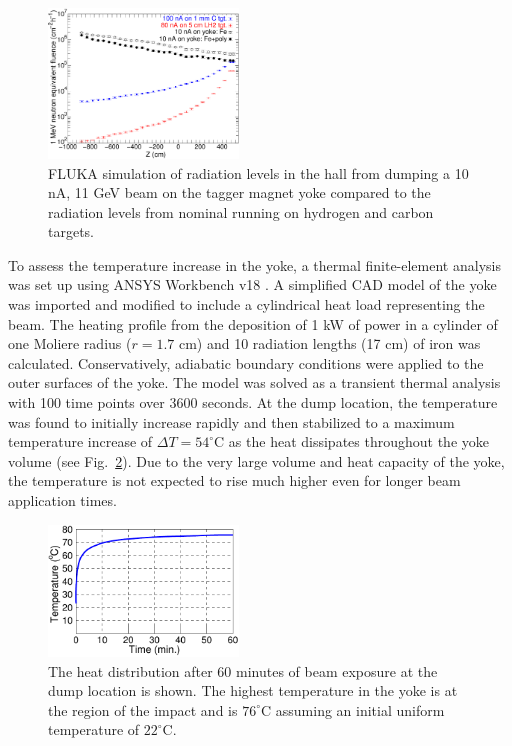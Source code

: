 \begin{figure}[hbt]
\begin{center}
\includegraphics[width=0.45\textwidth]{Radiation.pdf}
	\caption{FLUKA simulation of radiation levels in the hall from dumping a 10 nA, 11 GeV beam on the tagger magnet yoke compared to 
	the radiation levels from nominal running on hydrogen and carbon targets. }
\label{fig:raddem}
\end{center}
\end{figure}

To assess the temperature increase in the yoke, a thermal finite-element analysis was set up using ANSYS Workbench v18 \cite{ANSYS}. 
A simplified CAD model of the yoke was imported and modified to include a cylindrical heat load representing the beam. The heating 
profile from the deposition of 1 kW of power in a cylinder of one Moliere radius ($r = 1.7$ cm) and 10 radiation lengths (17 cm) of iron 
was calculated. Conservatively, adiabatic boundary conditions were applied to the outer surfaces of the yoke. The model was solved as 
a transient thermal analysis with 100 time points over 3600 seconds. At the dump location, the temperature was found to initially increase
rapidly and then stabilized to a maximum temperature increase of $\Delta T = 54^\circ$C as the heat dissipates throughout the yoke 
volume (see Fig.~\ref{fig:ansys_yoke}). Due to the very large volume and heat capacity of the yoke, the temperature is not expected to 
rise much higher even for longer beam application times.

\begin{figure}[hbt]
\begin{center}
\includegraphics[width=0.45\textwidth]{YokeHeating.pdf}
	\caption{The heat distribution after $60$ minutes of beam exposure at the dump location is shown. The highest temperature in the yoke 
	is at the region of the impact and is $76^\circ$C assuming an initial uniform temperature of $22^\circ$C.}
\label{fig:ansys_yoke}
\end{center}
\end{figure}





